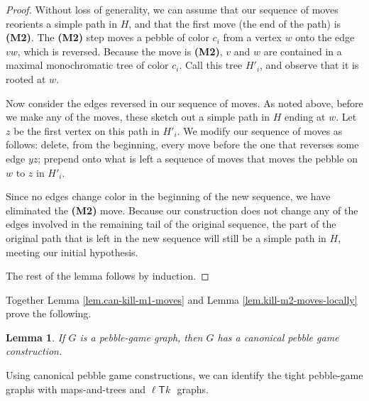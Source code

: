 \documentclass[Svgc,nospthms]{Svgc}
\newcommand{\ellteekay}{\ensuremath{\ell{\mathsf T}k}\,}
\newtheorem{lemma}[theorem]{Lemma}
\newcommand{\reflem}[1]{Lemma \ref{lem.#1}}
\newcommand{\labellem}[1]{\label{lem.#1}}
\begin{document}
	\begin{proof}
	Without loss of generality, we can assume that our sequence of moves reorients a 
	simple path in $H$, and that the first move (the end of the path)
	is {\bf (M2)}.  The {\bf (M2)} step moves a pebble 
	of color $c_i$ from a vertex $w$ onto the edge $vw$, which is reversed.  Because the move
	is {\bf (M2)}, $v$ and $w$ are contained in a maximal monochromatic tree of color $c_i$.
	Call this tree $H'_i$, and observe that it is rooted at $w$.
	
	Now consider the edges reversed in our sequence of moves.  As noted above, before we make
	any of the moves, these sketch out a simple path in $H$ ending at $w$.  Let $z$ be the 
	first vertex on this path in $H'_i$.  We modify our sequence of moves as follows: delete,
	from the beginning, every move before the one that reverses some edge $yz$; prepend onto
	what is left a sequence of moves that moves the pebble on $w$ to $z$ in $H'_i$.  
	
	Since no edges change color in the beginning of the new sequence, we have eliminated
	the {\bf (M2)} move.  Because our construction does not change 
	any of the edges involved in the remaining tail of the original sequence, the 
	part of the original path that is left in the new sequence will still be 
	a simple path in $H$, meeting our initial hypothesis.
	
	The rest of the lemma follows by induction.
	 \end{proof}
	
	Together \reflem{can-kill-m1-moves} and \reflem{kill-m2-moves-locally} prove the following. 
	\begin{lemma}
		If $G$ is a pebble-game graph, then $G$ has a canonical pebble game construction. 
		\labellem{canonical-constructions-exist} 
	\end{lemma}
	
	Using canonical pebble game constructions, we can identify 
	the tight pebble-game graphs with maps-and-trees and \ellteekay\, graphs. 
	
\end{document}
